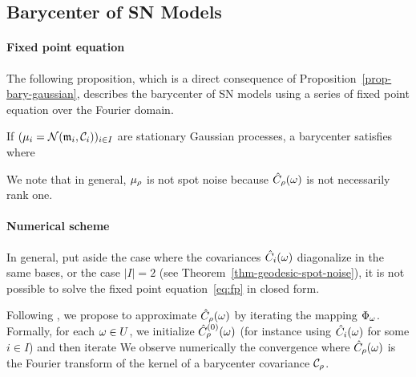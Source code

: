 \subsection{Barycenter of SN Models}

\paragraph{Fixed point equation}

The following proposition, which is a direct consequence of Proposition~\ref{prop-bary-gaussian}, describes the barycenter of SN models using a series of fixed point equation over the Fourier domain.

\begin{proposition}
	If $(\mu_i = \mathcal{N}({\frak m}_i,\mathcal{C}_i))_{i \in I}$ are stationary Gaussian processes, a barycenter satisfies
	where
\end{proposition}


We note that in general, $\mu_\rho$ is not spot noise because $\hat{C}_\rho(\omega)$ is not necessarily rank one.

\paragraph{Numerical scheme}

In general, put aside the case where the covariances $\hat {C}_i(\omega)$ diagonalize in the same bases, or the case $|I|=2$ (see Theorem~\ref{thm-geodesic-spot-noise}), it is not possible to solve the fixed point equation~\eqref{eq:fp} in closed form.

Following \cite{knott-barycenter-gaussian}, we propose to approximate $\hat {C}_\rho(\omega)$ by iterating the mapping $\Phi_\omega$. Formally, for each $\omega \in U$, we initialize $\hat {C}_\rho^{(0)}(\omega)$ (for instance using $\hat {C}_i(\omega)$ for some $i \in I$) and then iterate
We observe numerically the convergence
\eq{
	\hat \cov_\rho^{(\ell)}(\om) \overset{\ell \rightarrow +\infty}{\longrightarrow}
	\hat \cov_\rho(\om)
}
where $\hat {C}_\rho(\omega)$ is the Fourier transform of the kernel of a barycenter covariance $\mathcal{C}_\rho$.

